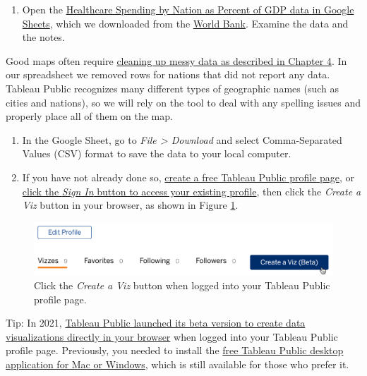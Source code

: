 \documentclass[
  english,
]{book}
\providecommand{\tightlist}{%
  \setlength{\itemsep}{0pt}\setlength{\parskip}{0pt}}
\begin{document}
\begin{enumerate}
\def\labelenumi{\arabic{enumi}.}
\tightlist
\item
  Open the \href{https://docs.google.com/spreadsheets/d/1tr9VrqKnO5tf55_YUCk441bFsZSI4zgMzW5ow3-wioo/edit\#gid=490588019}{Healthcare Spending by Nation as Percent of GDP data in Google Sheets}, which we downloaded from the \href{https://databank.worldbank.org/source/world-development-indicators}{World Bank}. Examine the data and the notes.
\end{enumerate}

Good maps often require \href{clean.html}{cleaning up messy data as described in Chapter 4}. In our spreadsheet we removed rows for nations that did not report any data. Tableau Public recognizes many different types of geographic names (such as cities and nations), so we will rely on the tool to deal with any spelling issues and properly place all of them on the map.

\begin{enumerate}
\def\labelenumi{\arabic{enumi}.}
\setcounter{enumi}{1}
\item
  In the Google Sheet, go to \emph{File \textgreater{} Download} and select Comma-Separated Values (CSV) format to save the data to your local computer.
\item
  If you have not already done so, \href{https://public.tableau.com/s/\#modal-signup}{create a free Tableau Public profile page}, or \href{https://public.tableau.com}{click the \emph{Sign In} button to access your existing profile}, then click the \emph{Create a Viz} button in your browser, as shown in Figure \ref{fig:tableau-create-viz}.
\end{enumerate}



\begin{figure}
\includegraphics[width=500px]{images/07-map/tableau-create-viz} \caption{Click the \emph{Create a Viz} button when logged into your Tableau Public profile page.}\label{fig:tableau-create-viz}
\end{figure}

Tip: In 2021, \href{https://public.tableau.com/en-us/s/blog/2021/08/create-data-visualizations-directly-browser-data-connectors-tableau-public}{Tableau Public launched its beta version to create data visualizations directly in your browser} when logged into your Tableau Public profile page. Previously, you needed to install the \href{https://public.tableau.com/en-us/s/download}{free Tableau Public desktop application for Mac or Windows}, which is still available for those who prefer it.
\end{document}
